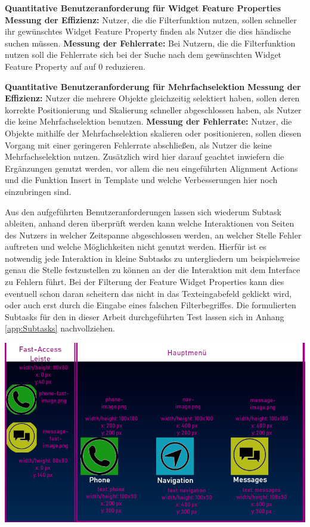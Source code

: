 \textbf{Quantitative Benutzeranforderung für Widget Feature Properties} \newline
\textbf{Messung der Effizienz:}
Nutzer, die die Filterfunktion nutzen, sollen schneller ihr gewünschtes Widget Feature Property finden als Nutzer die dies händische suchen müssen. \newline
\textbf{Messung der Fehlerrate:}
Bei Nutzern, die die Filterfunktion nutzen soll die Fehlerrate sich bei der Suche nach dem gewünschten Widget Feature Property auf auf 0 reduzieren.

\textbf{Quantitative Benutzeranforderung für Mehrfachselektion}\newline
\textbf{Messung der Effizienz:}
Nutzer die mehrere Objekte gleichzeitig selektiert haben, sollen deren korrekte Positionierung  und Skalierung schneller abgeschlossen haben, als Nutzer die keine Mehrfachselektion benutzen.\newline
\textbf{Messung der Fehlerrate:}
Nutzer, die Objekte mithilfe der Mehrfachselektion skalieren oder positionieren, sollen diesen Vorgang mit einer geringeren Fehlerrate abschließen, als Nutzer die keine Mehrfachselektion nutzen.
Zusätzlich wird hier darauf geachtet inwiefern die Ergänzungen genutzt werden, vor allem die neu eingeführten \glqq Alignment Actions\grqq{} und die Funktion \glqq Insert in Template\grqq{} und welche Verbesserungen hier noch einzubringen sind.

Aus den aufgeführten Benutzeranforderungen lassen sich wiederum Subtask ableiten, anhand deren überprüft werden kann welche Interaktionen von Seiten des Nutzers in welcher Zeitspanne abgeschlossen werden, an welcher Stelle Fehler auftreten und welche Möglichkeiten nicht genutzt werden.
Hierfür ist es notwendig jede Interaktion in kleine Subtasks zu untergliedern um beispielsweise genau die Stelle festzustellen zu können an der die Interaktion mit dem Interface zu Fehlern führt.
Bei der Filterung der Feature Widget Properties kann dies eventuell schon daran scheitern das nicht in das Texteingabefeld geklickt wird, oder auch erst durch die Eingabe eines falschen Filterbegriffes.
Die formulierten Subtasks für den in dieser Arbeit durchgeführten Test lassen sich in Anhang \ref{app:Subtasks} nachvollziehen.

\begin{center}
  \includegraphics[width=\textwidth]{figures/Styleguide_Rahmen.png}
  \label{fig:Styleguide}
\end{center}

